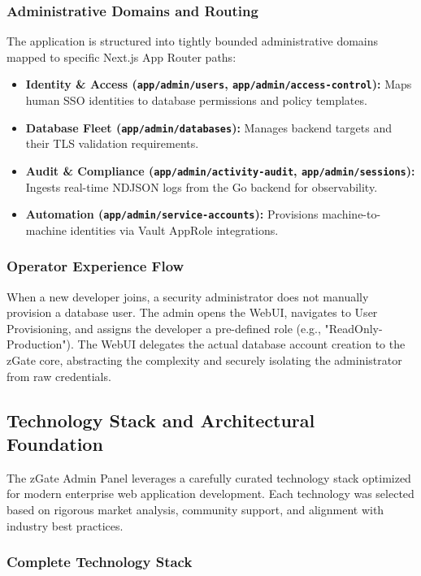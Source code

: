 \subsubsection{Administrative Domains and Routing}
The application is structured into tightly bounded administrative domains mapped to specific Next.js App Router paths:
\begin{itemize}
    \item \textbf{Identity \& Access (\texttt{app/admin/users}, \texttt{app/admin/access-control}):} Maps human SSO identities to database permissions and policy templates.
    \item \textbf{Database Fleet (\texttt{app/admin/databases}):} Manages backend targets and their TLS validation requirements.
    \item \textbf{Audit \& Compliance (\texttt{app/admin/activity-audit}, \texttt{app/admin/sessions}):} Ingests real-time NDJSON logs from the Go backend for observability.
    \item \textbf{Automation (\texttt{app/admin/service-accounts}):} Provisions machine-to-machine identities via Vault AppRole integrations.
\end{itemize}

\subsubsection{Operator Experience Flow}
When a new developer joins, a security administrator does not manually provision a database user. The admin opens the WebUI, navigates to User Provisioning, and assigns the developer a pre-defined role (e.g., "ReadOnly-Production"). The WebUI delegates the actual database account creation to the zGate core, abstracting the complexity and securely isolating the administrator from raw credentials.


\subsection{Technology Stack and Architectural Foundation}

The zGate Admin Panel leverages a carefully curated technology stack optimized for modern enterprise web application development. Each technology was selected based on rigorous market analysis, community support, and alignment with industry best practices.

\subsubsection{Complete Technology Stack}


